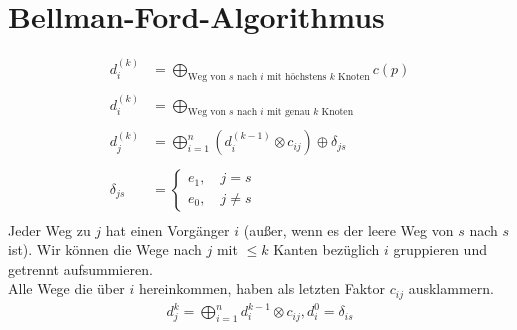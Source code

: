 \section{Bellman-Ford-Algorithmus}
\begin{align*}
d_i^{(k)} &= \bigoplus_{\text{Weg von $s$ nach $i$ mit höchstens $k$ Knoten}} c(p)\\
\\
d_i^{(k)} &= \bigoplus_{\text{Weg von $s$ nach $i$ mit genau $k$ Knoten}} \\
\\
d_j^{(k)} &= \bigoplus_{i=1}^n (d_i^{(k-1)} \otimes c_{ij}) \oplus \delta_{js}\\
\\
\delta_{js} &= \begin{cases}e_1,\quad j=s \\ e_0, \quad j \neq s \end{cases}\\
\end{align*}
Jeder Weg zu $j$ hat einen Vorgänger $i$ (außer, wenn es der leere Weg von $s$ nach $s$ ist). Wir können die Wege nach $j$ mit $\leq k$ Kanten bezüglich $i$ gruppieren und getrennt aufsummieren.\\
Alle Wege die über $i$ hereinkommen, haben als letzten Faktor $c_{ij}$ ausklammern.
\begin{align*}
d_j^k = \bigoplus_{i=1}^n d_i^{k-1} \otimes c_{ij}, d_i^0 = \delta_{is}\\
\end{align*}

